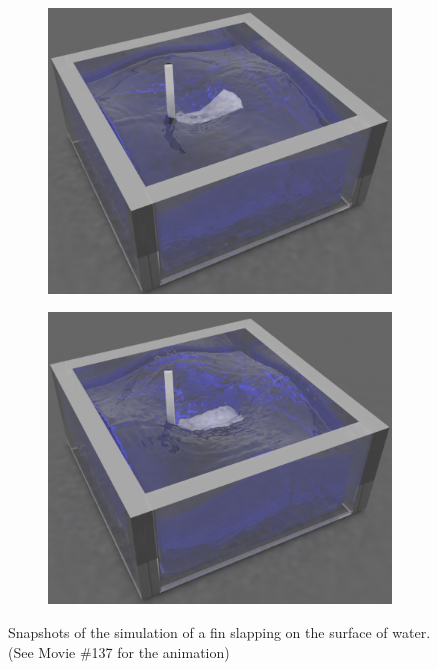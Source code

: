 	\begin{figure}[H]
	\centering	
	\begin{subfigure}{0.48\columnwidth}	
		\centering
		\includegraphics[width=1.0\textwidth]{images/Compliant_Robotics/Scene_flex.png}
	\end{subfigure}	
	\begin{subfigure}{0.47\columnwidth}	
		\centering
		\includegraphics[width=1.0\textwidth]{images/Compliant_Robotics/Scene_rigid.png}
	\end{subfigure}	
	\caption{Snapshots of the simulation of a fin slapping on the surface of water. (See \cite{sbelWebsiteAnimations} Movie \#137 for the animation)}\label{fig:Fin}
\end{figure}
